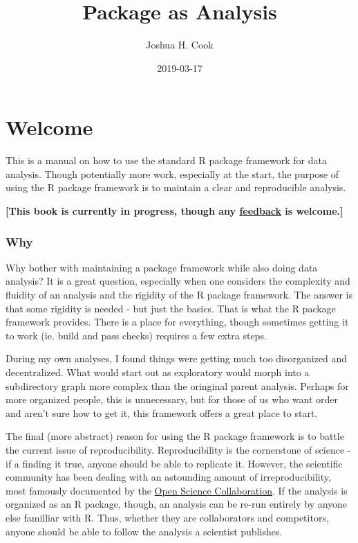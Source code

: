 \documentclass[]{book}
\title{Package as Analysis}
\author{Joshua H. Cook}
\date{2019-03-17}
\begin{document}
\maketitle

{
\setcounter{tocdepth}{1}
\tableofcontents
}
\hypertarget{welcome}{%
\chapter*{Welcome}\label{welcome}}

This is a manual on how to use the standard R package framework for data analysis. Though potentially more work, especially at the start, the purpose of using the R package framework is to maintain a clear and reproducible analysis.

\textbf{{[}This book is currently in progress, though any \href{https://github.com/jhrcook/package-as-analysis/issues}{feedback} is welcome.{]}}

\hypertarget{why}{%
\subsection*{Why}\label{why}}

Why bother with maintaining a package framework while also doing data analysis? It is a great question, especially when one considers the complexity and fluidity of an analysis and the rigidity of the R package framework. The answer is that some rigidity is needed - but just the basics. That is what the R package framework provides. There is a place for everything, though sometimes getting it to work (ie. build and pass checks) requires a few extra steps.

During my own analyses, I found things were getting much too disorganized and decentralized. What would start out as exploratory would morph into a subdirectory graph more complex than the oringinal parent analysis. Perhaps for more organized people, this is unnecessary, but for those of us who want order and aren't sure how to get it, this framework offers a great place to start.

The final (more abstract) reason for using the R package framework is to battle the current issue of reproducibility. Reproducibility is the cornerstone of science - if a finding it true, anyone should be able to replicate it. However, the scientific community has been dealing with an astounding amount of irreproducibility, most famously documented by the \href{http://science.sciencemag.org/content/349/6251/aac4716}{Open Science Collaboration}. If the analysis is organized as an R package, though, an analysis can be re-run entirely by anyone else familliar with R. Thus, whether they are collaborators and competitors, anyone should be able to follow the analysis a scientist publishes.
\end{document}
